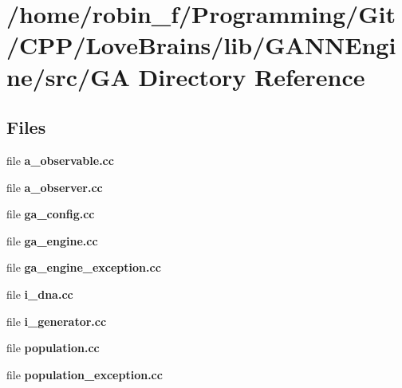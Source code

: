 \section{/home/robin\+\_\+f/\+Programming/\+Git/\+C\+P\+P/\+Love\+Brains/lib/\+G\+A\+N\+N\+Engine/src/\+G\+A Directory Reference}
\label{dir_9a1312bd6b91d21a2ae7e5f9e748b85d}
\subsection*{Files}
\begin{DoxyCompactItemize}
\item 
file {\bfseries a\+\_\+observable.\+cc}
\item 
file {\bfseries a\+\_\+observer.\+cc}
\item 
file {\bfseries ga\+\_\+config.\+cc}
\item 
file {\bfseries ga\+\_\+engine.\+cc}
\item 
file {\bfseries ga\+\_\+engine\+\_\+exception.\+cc}
\item 
file {\bfseries i\+\_\+dna.\+cc}
\item 
file {\bfseries i\+\_\+generator.\+cc}
\item 
file {\bfseries population.\+cc}
\item 
file {\bfseries population\+\_\+exception.\+cc}
\end{DoxyCompactItemize}

